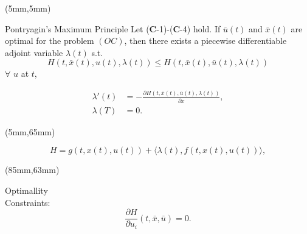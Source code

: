 \begin{frame}[plain]
	\begin{textblock*}{120mm}(5mm,5mm)
		\begin{graybox}{Pontryagin’s Maximum Principle}
			Let ($\mathbf{C}$-1)-($\mathbf{C}$-4) hold. If $\bar{u}(t)$ and $\bar{x}(t)$ are optimal for the problem $(OC)$, then there exists a piecewise differentiable adjoint variable $\lambda(t)$ s.t.
				\begin{equation*}
					H(t,\bar{x}(t),u(t),\lambda(t))\leq H(t,\bar{x}(t),\bar{u}(t),\lambda(t))
				\end{equation*}
			$\forall$ $u$ at $t$,

				\begin{align*}
					\lambda'(t) &= -\frac{\partial H(t,\bar{x}(t),\bar{u}(t),\lambda(t))}{\partial x},\\
					\lambda(T) &= 0.
				\end{align*}
		\end{graybox}
		
	\end{textblock*}
		\begin{textblock*}{75mm}(5mm,65mm)
		\begin{yellowbox}{}
			\begin{equation*}
			H=g(t,x(t),u(t))+\langle \lambda(t),f(t,x(t),u(t))\rangle,
			\end{equation*}
		\end{yellowbox}
	\end{textblock*}

\begin{textblock*}{40mm}(85mm,63mm)
	\begin{yellowbox}{Optimallity\\ Constraints:}
		\begin{equation*}
		\frac{\partial H}{\partial u_i}(t,\bar{x},\bar{u})=0.
		\end{equation*}
	\end{yellowbox}
\end{textblock*}


\end{frame}

